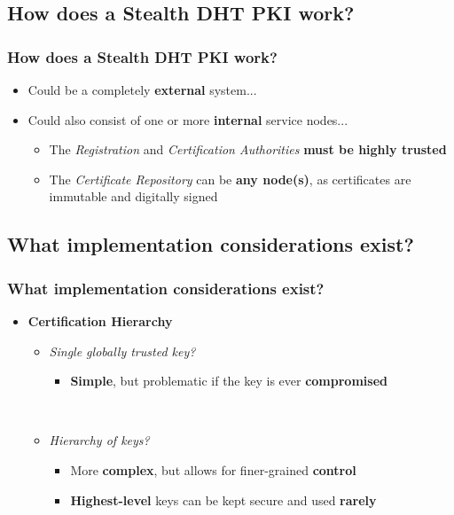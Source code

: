 \documentclass{beamer}
\begin{document}
\subsection{How does a Stealth DHT PKI work?}
\begin{frame}
  \frametitle{How does a Stealth DHT PKI work?}
  \begin{itemize}
  \item{Could be a completely \textbf{external} system...}
  \item{Could also consist of one or more \textbf{internal} service nodes...}
    \begin{itemize}
    \item{The {\it Registration} and {\it Certification Authorities} \textbf{must be highly trusted}}
    \item{The {\it Certificate Repository} can be \textbf{any node(s)}, as certificates are immutable and digitally signed}
    \end{itemize}
  \end{itemize}
\end{frame}

\subsection{What implementation considerations exist?}
\begin{frame}
  \frametitle{What implementation considerations exist?}
  \begin{itemize}
  \item{\textbf{Certification Hierarchy}}
    ~\\
    \begin{itemize}
    \item{\it Single globally trusted key?}
       \begin{itemize}
       \item{\textbf{Simple}, but problematic if the key is ever \textbf{compromised}}
       \end{itemize}
    ~\\
    \item{\it Hierarchy of keys?}
       \begin{itemize}
       \item{More \textbf{complex}, but allows for finer-grained \textbf{control}}
       \item{\textbf{Highest-level} keys can be kept secure and used \textbf{rarely}}
       \end{itemize}
    \end{itemize}
  \end{itemize}
\end{frame}
\end{document}
